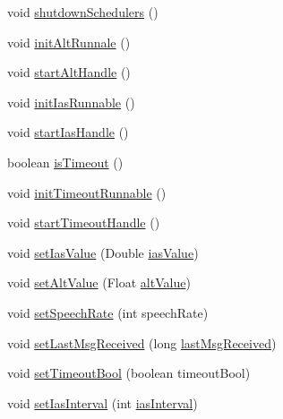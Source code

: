 \begin{DoxyCompactItemize}
\item 
void \hyperlink{classpt_1_1lsts_1_1asa_1_1feedback_1_1CallOut_a3c5f7b3bcbce5d32423a227764c1898a}{shutdown\+Schedulers} ()
\item 
void \hyperlink{classpt_1_1lsts_1_1asa_1_1feedback_1_1CallOut_a05911760056742ac560109a9b71a2220}{init\+Alt\+Runnale} ()
\item 
void \hyperlink{classpt_1_1lsts_1_1asa_1_1feedback_1_1CallOut_a375500d5ad3117a4b879c7c041e46264}{start\+Alt\+Handle} ()
\item 
void \hyperlink{classpt_1_1lsts_1_1asa_1_1feedback_1_1CallOut_a235f42d8f3ec05998582961d05b993c4}{init\+Ias\+Runnable} ()
\item 
void \hyperlink{classpt_1_1lsts_1_1asa_1_1feedback_1_1CallOut_ac821152969b1fcf993a61010dbb6a8e1}{start\+Ias\+Handle} ()
\item 
boolean \hyperlink{classpt_1_1lsts_1_1asa_1_1feedback_1_1CallOut_ae601e55b1c69a031254217b9d7489fee}{is\+Timeout} ()
\item 
void \hyperlink{classpt_1_1lsts_1_1asa_1_1feedback_1_1CallOut_aa98f265b81ae0ec49dcf2583c71195b9}{init\+Timeout\+Runnable} ()
\item 
void \hyperlink{classpt_1_1lsts_1_1asa_1_1feedback_1_1CallOut_a6a3094ed0932d4076d1d756a0a42b27b}{start\+Timeout\+Handle} ()
\item 
void \hyperlink{classpt_1_1lsts_1_1asa_1_1feedback_1_1CallOut_af4fafdeb1e77f3db647162e940ec0beb}{set\+Ias\+Value} (Double \hyperlink{classpt_1_1lsts_1_1asa_1_1feedback_1_1CallOut_a6185a47dfdbf7690e1ab9db99d8a41da}{ias\+Value})
\item 
void \hyperlink{classpt_1_1lsts_1_1asa_1_1feedback_1_1CallOut_a3e7b26e71547ff3a34d8fe17a3173c70}{set\+Alt\+Value} (Float \hyperlink{classpt_1_1lsts_1_1asa_1_1feedback_1_1CallOut_a2d26c980dd82169789dad88bf86666ee}{alt\+Value})
\item 
void \hyperlink{classpt_1_1lsts_1_1asa_1_1feedback_1_1CallOut_a6ca0021c490f18f045cf98e6256c0820}{set\+Speech\+Rate} (int speech\+Rate)
\item 
void \hyperlink{classpt_1_1lsts_1_1asa_1_1feedback_1_1CallOut_a9d27a6be51f533798827f3f778ea4886}{set\+Last\+Msg\+Received} (long \hyperlink{classpt_1_1lsts_1_1asa_1_1feedback_1_1CallOut_a5a64e34dcc12acad25b1a68f2eaa5e13}{last\+Msg\+Received})
\item 
void \hyperlink{classpt_1_1lsts_1_1asa_1_1feedback_1_1CallOut_a8c49342455276f54315b1e59fce17aed}{set\+Timeout\+Bool} (boolean timeout\+Bool)
\item 
void \hyperlink{classpt_1_1lsts_1_1asa_1_1feedback_1_1CallOut_a8f7a63d8f6431e95249b2e4332d42c9f}{set\+Ias\+Interval} (int \hyperlink{classpt_1_1lsts_1_1asa_1_1feedback_1_1CallOut_a6dda52076ca54ce6b2b2cfd9146170e7}{ias\+Interval})

\end{DoxyCompactItemize}
